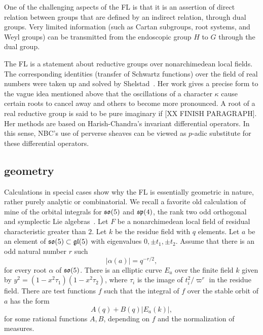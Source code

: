 \documentclass[brochure,english,12pt]{bourbaki}
\def\so{\frak{so}}
\def\sp{\frak{sp}}
\def\gl{\frak{gl}}
\begin{document}
One of the challenging aspects of the FL is that it is an assertion of
direct relation between groups that are defined by an indirect
relation, through dual groups.  Very limited information (such as
Cartan subgroups, root systems, and Weyl groups) can be transmitted
from the endoscopic group $H$ to $G$ through the dual group.

The FL is a statement about reductive groups over nonarchimedean local
fields.  The corresponding identities (transfer of Schwartz functions)
over the field of real numbers were taken up and solved by
Shelstad~\cite{XX}.  Her work gives a precise form to the vague idea
mentioned above that the oscillations of a character $\kappa$ cause
certain roots to cancel away and others to become more pronounced.  A
root of a real reductive group is said to be pure imaginary if [XX FINISH PARAGRAPH].   
Her
methods are based on Harish-Chandra's invariant differential
operators.  In this sense, NBC's use of perverse sheaves can be viewed
as $p$-adic substitute for these differential operators.


\subsection{geometry}

Calculations in special cases show why the FL is
essentially geometric in nature, rather purely analytic or
combinatorial. We recall a favorite old calculation of mine of the
orbital integrals for $\so(5)$ and $\sp(4)$, the rank two odd
orthogonal and symplectic Lie algebras~\cite{hyperelliptic-curves}.  
Let $F$ be a nonarchimedean
local field of residual characteristic greater than $2$.  Let $k$ be
the residue field with $q$ elements.  Let $a$ be an element of
$\so(5)\subset \gl(5)$ with eigenvalues $0,\pm t_1,\pm t_2$.  Assume
that there is an odd natural number $r$ such
\[
|\alpha(a)| = q^{-r/2},
\]
for every root $\alpha$ of $\so(5)$. 
There is an elliptic curve $E_a$ over the finite field $k$ given by
$y^2 = (1-x^2\tau_1)(1-x^2\tau_2)$, where $\tau_i$ is the image
of $t_i^2/\varpi^r$ in the residue field.  There are test functions $f$ 
such that the integral of $f$ over the stable orbit
of $a$ has the form
\begin{equation}\label{eqn:elliptic}
A(q) + B(q) | E_a(k)|,
\end{equation}
for some rational functions $A,B$, depending on $f$ and the normalization of measures.
\end{document}
